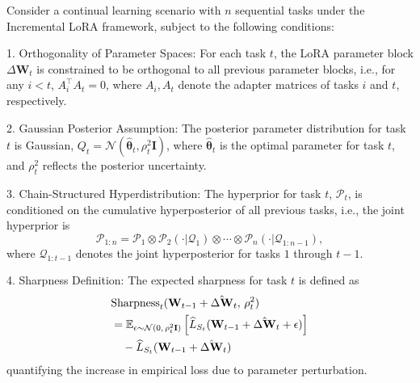 \documentclass[letterpaper]{article} %
\begin{document}
Consider a continual learning scenario with $n$ sequential tasks under the Incremental LoRA framework, subject to the following conditions:

1. Orthogonality of Parameter Spaces: For each task $t$, the LoRA parameter block $\Delta\mathbf{W}_t$ is constrained to be orthogonal to all previous parameter blocks, i.e., for any $i < t$, $A_i^\top A_t = 0$, where $A_i, A_t$ denote the adapter matrices of tasks $i$ and $t$, respectively.

2. Gaussian Posterior Assumption: The posterior parameter distribution for task $t$ is Gaussian, $Q_t = \mathcal{N}(\hat{\boldsymbol{\theta}}_t, \rho_t^2 \mathbf{I})$, where $\hat{\boldsymbol{\theta}}_t$ is the optimal parameter for task $t$, and $\rho_t^2$ reflects the posterior uncertainty.

3. Chain-Structured Hyperdistribution: The hyperprior for task $t$, $\mathcal{P}_t$, is conditioned on the cumulative hyperposterior of all previous tasks, i.e., the joint hyperprior is
   $$
   \mathcal{P}_{1:n} = \mathcal{P}_1 \otimes \mathcal{P}_2(\cdot|\mathcal{Q}_1) \otimes \cdots \otimes \mathcal{P}_n(\cdot|\mathcal{Q}_{1:n-1}),
   $$ where $\mathcal{Q}_{1:t-1}$ denotes the joint hyperposterior for tasks $1$ through $t-1$.

4. Sharpness Definition: The expected sharpness for task $t$ is defined as
\begin{align}
&\mathrm{Sharpness}_t(\mathbf{W}_{t-1} + \hat{\Delta\mathbf{W}}_t,\, \rho_t^2) \notag\\
& = \mathbb{E}_{\epsilon \sim \mathcal{N}(0,\, \rho_t^2 \mathbf{I})}
\left[ \widehat{L}_{S_t}(\mathbf{W}_{t-1} + \hat{\Delta\mathbf{W}}_t + \epsilon) \right] \notag\\
&\quad - \widehat{L}_{S_t}(\mathbf{W}_{t-1} + \hat{\Delta\mathbf{W}}_t) \notag
\end{align}
quantifying the increase in empirical loss due to parameter perturbation.
\end{document}
